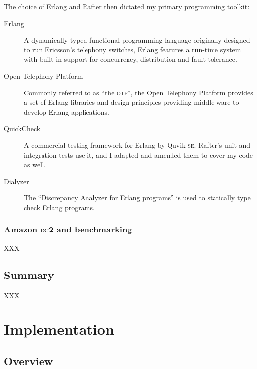 \documentclass[11pt,chapterprefix=true,toc=bibliography,numbers=noendperiod,
               footnotes=multiple,twoside]{scrreprt}
\newcommand{\ECC}[0]{\textsc{ec}2 }
\begin{document}
The choice of Erlang and Rafter then dictated my primary programming toolkit:

\begin{description}
    \item[Erlang] A dynamically typed functional programming language originally designed to run Ericsson's telephony switches, Erlang features a run-time system with built-in support for concurrency, distribution and fault tolerance.
    \item[Open Telephony Platform] Commonly referred to as \enquote{the \textsc{otp}}, the Open Telephony Platform provides a set of Erlang libraries and design principles providing middle-ware to develop Erlang applications.
    \item[QuickCheck] A commercial testing framework for Erlang by Quvik \textsc{se}. Rafter's unit and integration tests use it, and I adapted and amended them to cover my code as well.
    \item[Dialyzer] The \enquote{Discrepancy Analyzer for Erlang programs} is used to statically type check Erlang programs.
\end{description}

\subsection{Amazon \ECC and benchmarking\label{ssc:ec2-benchmarking}}

XXX

\section{Summary}

XXX

\chapter{Implementation\label{ch:implementation}}


\section{Overview}
\end{document}
